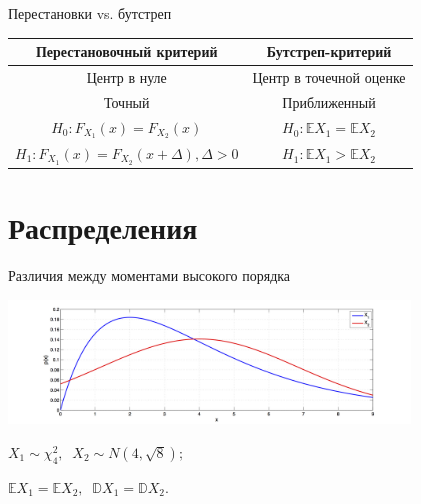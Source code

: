 \documentclass[9pt,pdf,utf8,hyperref={unicode},aspectratio=169]{beamer}
\begin{document}
\begin{frame}{Перестановки vs. бутстреп}
    \centering
    \begin{tabular}{|c|c|}
    \hline
    \bf Перестановочный критерий & \bf Бутстреп-критерий\\
    \hline
    Центр в нуле & Центр в точечной оценке \\ \hline
    Точный & Приближенный \\ \hline
    $H_0\colon F_{X_1}(x) = F_{X_2}(x)$ & $H_0\colon \mathbb{E}X_1 = \mathbb{E}X_2$ \\ 
    $H_1\colon F_{X_1}(x) = F_{X_2}(x+\Delta), \Delta>0$ & $H_1\colon \mathbb{E}X_1 > \mathbb{E}X_2$\\\hline
    \end{tabular}
	
\end{frame}



\section{Распределения}

\begin{frame}{Различия между моментами высокого порядка}
 \begin{center}
     \includegraphics[width=0.8\textwidth,trim=30mm 0mm 30mm 5mm,clip]{distrdiff_example.png}
 \end{center}

 $X_1\sim \chi^2_4, \;\; X_2\sim N\left(4,\sqrt{8}\right);$

 $\mathbb{E}X_1=\mathbb{E}X_2, \;\; \mathbb{D}X_1 = \mathbb{D}X_2.$
\end{frame}
\end{document}
